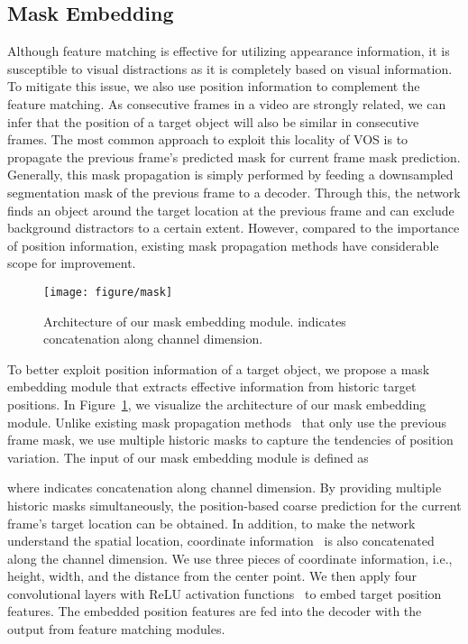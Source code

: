 \documentclass[10pt,twocolumn,letterpaper]{article}
\begin{document}
	\subsection{Mask Embedding}
	\label{mask embedding}
	Although feature matching is effective for utilizing appearance information, it is susceptible to visual distractions as it is completely based on visual information. To mitigate this issue, we also use position information to complement the feature matching. As consecutive frames in a video are strongly related, we can infer that the position of a target object will also be similar in consecutive frames. The most common approach to exploit this locality of VOS is to propagate the previous frame’s predicted mask for current frame mask prediction. Generally, this mask propagation is simply performed by feeding a downsampled segmentation mask of the previous frame to a decoder. Through this, the network finds an object around the target location at the previous frame and can exclude background distractors to a certain extent. However, compared to the importance of position information, existing mask propagation methods have considerable scope for improvement.
	
	
	\begin{figure}[t]
		\centering
		\texttt{[image: figure/mask]}
		\caption{Architecture of our mask embedding module.  indicates concatenation along channel dimension.}
		\label{figure4}
	\end{figure}
	
	
	To better exploit position information of a target object, we propose a mask embedding module that extracts effective information from historic target positions. In Figure~\ref{figure4}, we visualize the architecture of our mask embedding module. Unlike existing mask propagation methods~\cite{A-GAME, FEELVOS, RANet} that only use the previous frame mask, we use multiple historic masks to capture the tendencies of position variation. The input of our mask embedding module is defined as
	
	where  indicates concatenation along channel dimension. By providing multiple historic masks simultaneously, the position-based coarse prediction for the current frame’s target location can be obtained. In addition, to make the network understand the spatial location, coordinate information~\cite{coord} is also concatenated along the channel dimension. We use three pieces of coordinate information, i.e., height, width, and the distance from the center point. We then apply four convolutional layers with ReLU activation functions~\cite{relu} to embed target position features. The embedded position features are fed into the decoder with the output from feature matching modules.
	
\end{document}
